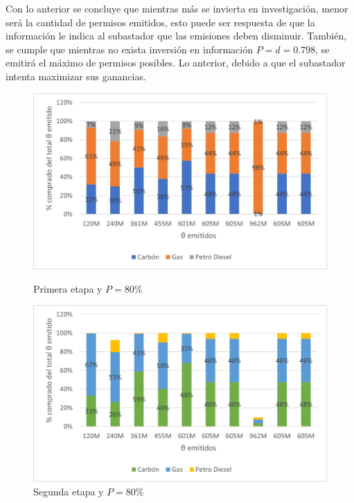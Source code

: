 Con lo anterior se concluye que mientras más se invierta en investigación, menor será la cantidad de permisos emitidos, esto puede ser respuesta de que la información le indica al subastador que las emisiones deben disminuir. También, se cumple que mientras no exista inversión en información $P=d=0.798$, se emitirá el máximo de permisos posibles. Lo anterior, debido a que el subastador intenta maximizar sus ganancias.
\vspace{2.5mm}

\begin{figure}[H]
  \centering
  \begin{minipage}[b]{0.49\textwidth}
    \includegraphics[width=\textwidth]{docs/DocumentoMemoria/core/images/distribucion primera etapa.png}
    \caption{{\footnotesize Primera etapa y $P=80\%$}}
    \label{petapaPO}
  \end{minipage}
  \hfill
  \begin{minipage}[b]{0.49\textwidth}
    \includegraphics[width=\textwidth]{docs/DocumentoMemoria/core/images/distribucion segunda etapa.png}
    \caption{{\footnotesize Segunda etapa y $P=80\%$}}
    \label{setapaPO}
  \end{minipage}
\end{figure}

